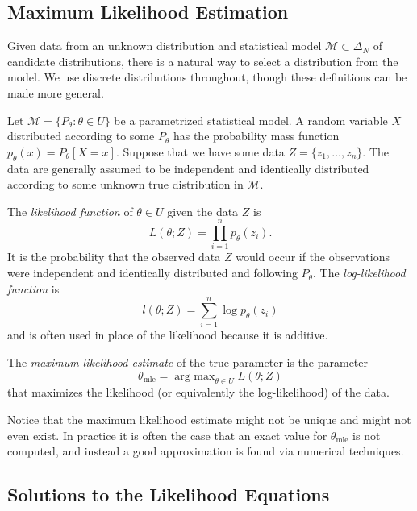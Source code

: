\documentclass[11pt,titlepage]{article}
\newcommand*{\Mod}{\mathcal{M}}
\newcommand*{\mle}{\theta_{\text{mle}}}
\DeclareMathOperator*{\argmax}{arg\ max}
\numberwithin{equation}{section}
\begin{document}
\subsection{Maximum Likelihood Estimation}

    Given data from an unknown distribution and statistical model $\Mod \subset
    \Delta_N$ of candidate distributions, there is a natural way to select a
    distribution from the model.  We use discrete distributions throughout,
    though these definitions can be made more general.

    Let $\Mod = \{P_\theta : \theta \in U\}$ be a parametrized statistical
    model. A random variable $X$ distributed according to some $P_\theta$ has
    the probability mass function $p_\theta(x) = P_\theta[X = x]$.  Suppose that
    we have some data $Z = \{z_1, \ldots, z_n\}$.  The data are generally assumed to
    be independent and identically distributed according to some unknown true
    distribution in $\Mod$.
    
    \begin{definition}
        The \emph{likelihood function} of $\theta \in U$ given the data $Z$ is
        \[
            L(\theta; Z) = \prod_{i=1}^n p_\theta(z_i).
        \]
        It is the probability that the observed data $Z$ would occur if the
        observations were independent and identically distributed and following
        $P_\theta$.  The \emph{log-likelihood function} is
        \[
            l(\theta; Z) = \sum_{i=1}^n \log p_\theta(z_i)
        \]
        and is often used in place of the likelihood because it is additive.
    \end{definition}
    \begin{definition}
        The \emph{maximum likelihood estimate} of the true parameter is the
        parameter 
        \[
            \mle = \argmax_{\theta \in U} L(\theta; Z)
        \]
        that maximizes the likelihood (or equivalently the log-likelihood) of
        the data.
    \end{definition}

    Notice that the maximum likelihood estimate might not be unique and might
    not even exist.  In practice it is often the case that an exact value for
    $\mle$ is not computed, and instead a good approximation is found via
    numerical techniques.

\subsection{Solutions to the Likelihood Equations}
\end{document}
